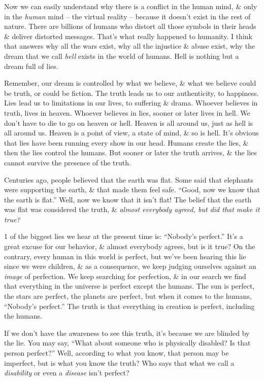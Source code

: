 \documentclass{article}
\numberwithin{equation}{section}
\begin{document}
Now we can easily understand why there is a conflict in the human mind, \& only in the \textit{human} mind -- the virtual reality -- because it doesn't exist in the rest of nature. There are billions of humans who distort all those symbols in their heads \& deliver distorted messages. That's what really happened to humanity. I think that answers why all the wars exist, why all the injustice \& abuse exist, why the dream that we call \textit{hell} exists in the world of humans. Hell is nothing but a dream full of lies.

Remember, our dream is controlled by what we believe, \& what we believe could be truth, or could be fiction. The truth leads us to our authenticity, to happiness. Lies lead us to limitations in our lives, to suffering \& drama. Whoever believes in truth, lives in heaven. Whoever believes in lies, sooner or later lives in hell. We don't have to die to go on heaven or hell. Heaven is all around us, just as hell is all around us. Heaven is a point of view, a state of mind, \& so is hell. It's obvious that lies have been running every show in our head. Humans create the lies, \& then the lies control the humans. But sooner or later the truth arrives, \& the lies cannot survive the presence of the truth.

Centuries ago, people believed that the earth was flat. Some said that elephants were supporting the earth, \& that made them feel safe. ``Good, now we know that the earth is flat.'' Well, now we know that it isn't flat! The belief that the earth was flat was considered the truth, \& \textit{almost everybody agreed, but did that make it true?}

1 of the biggest lies we hear at the present time is: ``Nobody's perfect.'' It's a great excuse for our behavior, \& almost everybody agrees, but is it true? On the contrary, every human in this world is perfect, but we've been hearing this lie since we were children, \& as a consequence, we keep judging ourselves against an \textit{image} of perfection. We keep searching for perfection, \& in our search we find that everything in the universe is perfect except the humans. The sun is perfect, the stars are perfect, the planets are perfect, but when it comes to the humans, ``Nobody's perfect.'' The truth is that everything in creation is perfect, including the humans.

If we don't have the awareness to see this truth, it's because we are blinded by the lie. You may say, ``What about someone who is physically disabled? Is that person perfect?'' Well, according to what you know, that person may be imperfect, but is what you know the truth? Who says that what we call a \textit{disability} or even a \textit{disease} isn't perfect?
\end{document}
